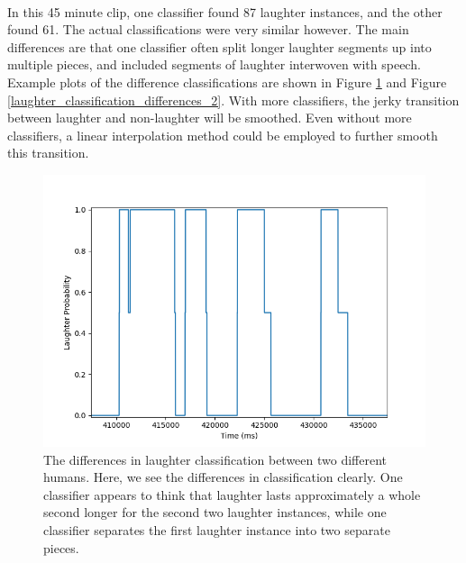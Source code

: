 \documentclass[a4paper,11pt,notitlepage]{article}
\begin{document}
\\
In this 45 minute clip, one classifier found 87 laughter instances, and the other found 61. The actual classifications were very similar however. The main differences are that one classifier often split longer laughter segments up into multiple pieces, and included segments of laughter interwoven with speech. Example plots of the difference classifications are shown in Figure \ref{laughter_classification_differences_1} and Figure \ref{laughter_classification_differences_2}. With more classifiers, the jerky transition between laughter and non-laughter will be smoothed. Even without more classifiers, a linear interpolation method could be employed to further smooth this transition.
\begin{figure}[H]
	\centering
	\vspace{0.5cm}
	\includegraphics[scale = 0.75]{figs/differences_1.png}
	\caption{The differences in laughter classification between two different humans. Here, we see the differences in classification clearly. One classifier appears to think that laughter lasts approximately a whole second longer for the second two laughter instances, while one classifier separates the first laughter instance into two separate pieces.}
	\label{laughter_classification_differences_1}
\end{figure}
\end{document}
